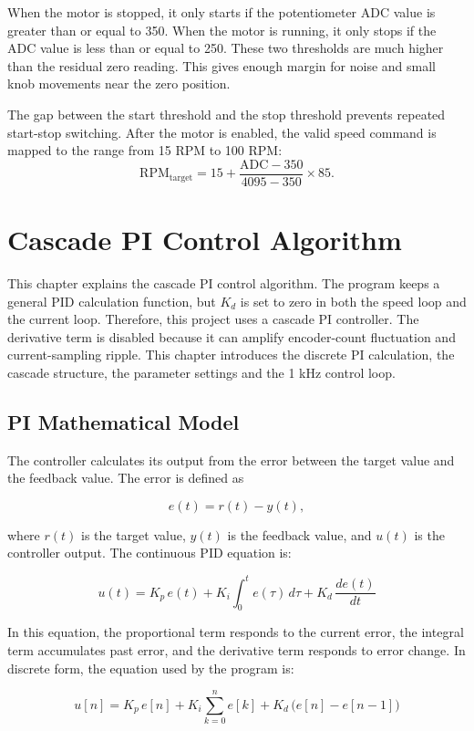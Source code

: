\documentclass[12pt, a4paper]{report}
\begin{document}
When the motor is stopped, it only starts if the potentiometer ADC value is greater than or equal to 350. When the motor is running, it only stops if the ADC value is less than or equal to 250. These two thresholds are much higher than the residual zero reading. This gives enough margin for noise and small knob movements near the zero position.

The gap between the start threshold and the stop threshold prevents repeated start-stop switching. After the motor is enabled, the valid speed command is mapped to the range from 15 RPM to 100 RPM:
\[
\text{RPM}_{\text{target}}
=15+\frac{\text{ADC}-350}{4095-350}\times85.
\]

\chapter{Cascade PI Control Algorithm}

This chapter explains the cascade PI control algorithm. The program keeps a general PID calculation function, but \(K_d\) is set to zero in both the speed loop and the current loop. Therefore, this project uses a cascade PI controller. The derivative term is disabled because it can amplify encoder-count fluctuation and current-sampling ripple. This chapter introduces the discrete PI calculation, the cascade structure, the parameter settings and the 1 kHz control loop.


\section{PI Mathematical Model}

The controller calculates its output from the error between the target value and the feedback value. The error is defined as

\[
e(t)=r(t)-y(t),
\]

where \(r(t)\) is the target value, \(y(t)\) is the feedback value, and \(u(t)\) is the controller output. The continuous PID equation is:

\[
u(t) = K_p\,e(t) + K_i\int_0^t e(\tau)\,d\tau + K_d\,\frac{de(t)}{dt}
\]

In this equation, the proportional term responds to the current error, the integral term accumulates past error, and the derivative term responds to error change. In discrete form, the equation used by the program is:

\begin{equation}
u[n] = K_p\,e[n]
+ K_i \sum_{k=0}^{n} e[k]
+ K_d\,\bigl(e[n] - e[n-1]\bigr)
\label{eq:pid_discrete}
\end{equation}
\end{document}
